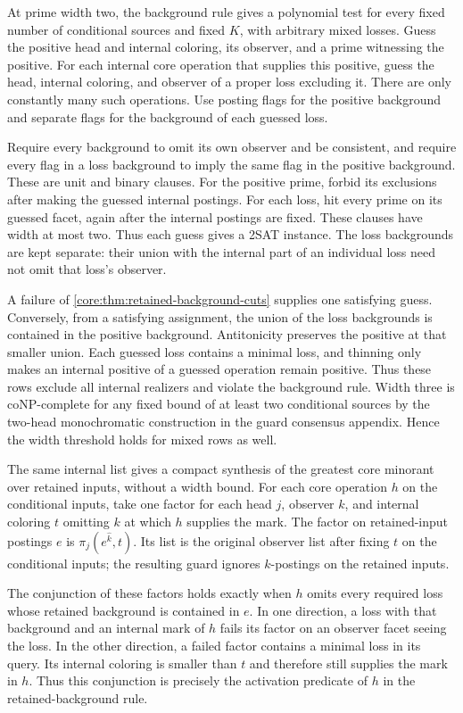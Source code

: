 At prime width two, the background rule gives a polynomial
test for every fixed number of conditional sources and
fixed $K$, with arbitrary mixed losses. Guess the positive
head and internal coloring, its observer, and a prime
witnessing the positive. For each internal core operation
that supplies this positive, guess the head, internal
coloring, and observer of a proper loss excluding it.
There are only constantly many such operations. Use
posting flags for the positive background and separate
flags for the background of each guessed loss.

Require every background to omit its own observer and
be consistent, and require every flag in a loss background
to imply the same flag in the positive background. These
are unit and binary clauses. For the positive prime,
forbid its exclusions after making the guessed internal
postings. For each loss, hit every prime on its guessed
facet, again after the internal postings are fixed.
These clauses have width at most two. Thus each guess gives
a 2SAT instance. The loss backgrounds are kept separate:
their union with the internal part of an individual
loss need not omit that loss's observer.

A failure of \cref{core:thm:retained-background-cuts}
supplies one satisfying guess. Conversely, from a
satisfying assignment, the union of the loss backgrounds
is contained in the positive background. Antitonicity
preserves the positive at that smaller union. Each
guessed loss contains a minimal loss, and thinning
only makes an internal positive of a guessed operation
remain positive. Thus these rows exclude all internal
realizers and violate the background rule. Width three
is coNP-complete for any fixed bound of at least two
conditional sources by the two-head monochromatic
construction in the guard consensus appendix. Hence
the width threshold holds for mixed rows as well.

The same internal list gives a compact synthesis
of the greatest core minorant over retained inputs,
without a width bound. For each core operation
$h$ on the conditional inputs, take one factor for
each head $j$, observer $k$, and internal coloring
$t$ omitting $k$ at which $h$ supplies the mark.
The factor on retained-input postings $e$ is
$\pi_j(e^{\widehat k},t)$. Its list is the original
observer list after fixing $t$ on the conditional
inputs; the resulting guard ignores $k$-postings
on the retained inputs.

The conjunction of these factors holds exactly
when $h$ omits every required loss whose retained
background is contained in $e$. In one direction,
a loss with that background and an internal mark
of $h$ fails its factor on an observer facet
seeing the loss. In the other direction, a failed
factor contains a minimal loss in its query.
Its internal coloring is smaller than $t$ and
therefore still supplies the mark in $h$.
Thus this conjunction is precisely the activation
predicate of $h$ in the retained-background rule.

